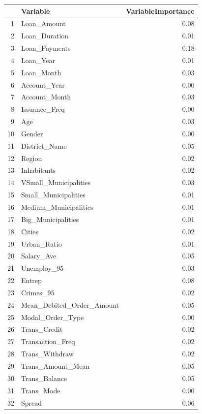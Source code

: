 \documentclass[11pt,preprint, authoryear]{elsarticle}
\let\origtable\table
\let\endorigtable\endtable
\renewenvironment{table}[1][2] {
    \expandafter\origtable\expandafter[H]
} {
    \endorigtable
}
\numberwithin{equation}{section}
\numberwithin{figure}{section}
\numberwithin{table}{section}
\begin{document}
\begin{table}[H]
\centering
\begin{tabular}{rlr}
  \hline
 & Variable & VariableImportance \\ 
  \hline
1 & Loan\_Amount & 0.08 \\ 
  2 & Loan\_Duration & 0.01 \\ 
  3 & Loan\_Payments & 0.18 \\ 
  4 & Loan\_Year & 0.01 \\ 
  5 & Loan\_Month & 0.03 \\ 
  6 & Account\_Year & 0.00 \\ 
  7 & Account\_Month & 0.03 \\ 
  8 & Issuance\_Freq & 0.00 \\ 
  9 & Age & 0.03 \\ 
  10 & Gender & 0.00 \\ 
  11 & District\_Name & 0.05 \\ 
  12 & Region & 0.02 \\ 
  13 & Inhabitants & 0.02 \\ 
  14 & VSmall\_Municipalities & 0.03 \\ 
  15 & Small\_Municipalities & 0.01 \\ 
  16 & Medium\_Municipalities & 0.01 \\ 
  17 & Big\_Municipalities & 0.01 \\ 
  18 & Cities & 0.02 \\ 
  19 & Urban\_Ratio & 0.01 \\ 
  20 & Salary\_Ave & 0.05 \\ 
  21 & Unemploy\_95 & 0.03 \\ 
  22 & Entrep & 0.08 \\ 
  23 & Crimes\_95 & 0.02 \\ 
  24 & Mean\_Debited\_Order\_Amount & 0.05 \\ 
  25 & Modal\_Order\_Type & 0.00 \\ 
  26 & Trans\_Credit & 0.02 \\ 
  27 & Transaction\_Freq & 0.02 \\ 
  28 & Trans\_Withdraw & 0.02 \\ 
  29 & Trans\_Amount\_Mean & 0.05 \\ 
  30 & Trans\_Balance & 0.05 \\ 
  31 & Trans\_Mode & 0.00 \\ 
  32 & Spread & 0.06 \\ 
   \hline
\end{tabular}
\caption{Variable Importance for Causal Forest \label{VarImpCForest}} 
\end{table}
\end{document}

